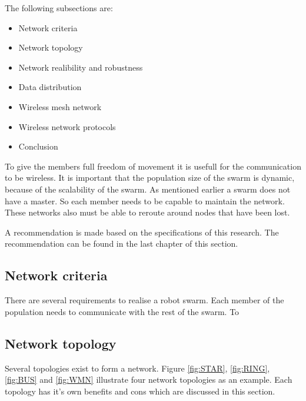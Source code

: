 \documentclass[10pt,a4paper]{article}
\begin{document}
The following subsections are:
\begin{itemize}
\setlength\itemsep{0em}
    \item Network criteria
    \item Network topology
    \item Network realibility and robustness
    \item Data distribution
    \item Wireless mesh network
    \item Wireless network protocols
    \item Conclusion
\end{itemize}


To give the members full freedom of movement it is usefull for the communication to be wireless. It is important that the population size of the swarm is dynamic, because of the scalability of the swarm. As mentioned earlier a swarm does not have a master. So each member needs to be capable to maintain the network. These networks also must be able to reroute around nodes that have been lost. \cite{Swarmwiki}\cite{swarmintelligence}

A recommendation is made based on the specifications of this research. The recommendation can be found in the last chapter of this section.

\subsection{Network criteria}
There are several requirements to realise a robot swarm. Each member of the population needs to communicate with the rest of the swarm. To

\newpage
\subsection{Network topology}
Several topologies exist to form a network. Figure \ref{fig:STAR}, \ref{fig:RING}, \ref{fig:BUS} and \ref{fig:WMN} illustrate four network topologies as an example. Each topology has it's own benefits and cons which are discussed in this section.
\end{document}
